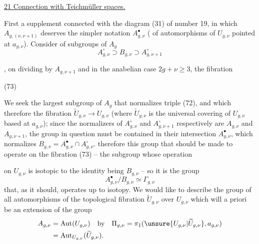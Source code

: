 
\uline{21 Connection with Teichmüller spaces.}

First a supplement connected with the diagram  (31) of number 19, in which \(A_{g,(\nu,\nu+1)}\) deserves the simpler notation \(A_{g,\nu}^{\bullet}\) ( of automorphisms of \(U_{g,\nu}\) pointed at \(a_{g,\nu}\)). Consider  of subgroups of \(A_g\)
\[
 A_{g,\nu}^{\circ}\supset B_{g,\nu}\supset A_{g,\nu+1}^{\circ}
 \tag{72}
\]

, on dividing by \(A_{g,\nu+1}\) and in the anabelian case \(2g+\nu\geq 3\), the fibration

\begin{samepage}
(73) 
\end{samepage}

We seek the largest subgroup of \(A_g\) that normalizes  triple (72), and which   therefore  the fibration \(\widetilde U_{g,\nu}\to U_{g,\nu}\) (where \(\widetilde U_{g,\nu}\) is the universal covering of \(U_{g,\nu}\) based at \(a_{g,\nu}\)); since the normalizers of \(A_{g,\nu}^{\circ}\) and \(A_{g,\nu+1}^{\circ}\) respectively are \(A_{g,\nu}\) and \(A_{g,\nu+1}\), the group in question must be contained in their intersection \(A_{g,\nu}^{\bullet}\), which normalizes  \(B_{g,\nu}=A_{g,\nu}^{\bullet}\cap A_{g,\nu}^{\circ}\).  therefore this group that should be made to operate on the fibration (73) -- the subgroup    whose operation


on \(U_{g,\nu}\) is isotopic to the identity being  \(B_{g,\nu}\) -- so it is the group \unsure{\(\Gamma\)}
\[
 A_{g,\nu}^{\bullet}/B_{g,\nu}\simeq\Gamma_{g,\nu}
\]
that, as it should, operates up to isotopy. We would like to describe the group of all automorphisms of the topological fibration \(\widetilde U_{g,\nu}\) over \(U_{g,\nu}\) which will a priori be an extension of the group
\[
 \begin{aligned}
 A_{g,\nu}&=\operatorname{Aut}(U_{g,\nu})\quad\text{by}\quad
 \Pi_{g,\nu}=\pi_1(\unsure{U_{g,\nu}|\widetilde U_{g,\nu}},a_{g,\nu})\\
 &=\operatorname{Aut}_{U_{g,\nu}}(\widetilde U_{g,\nu}).
 \end{aligned}
\]

